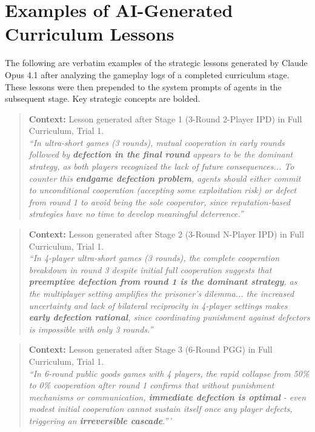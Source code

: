 \documentclass[11pt]{article}
\begin{document}
\section{Examples of AI-Generated Curriculum Lessons}
\label{app:claude_lessons}
The following are verbatim examples of the strategic lessons generated by Claude Opus 4.1 after analyzing the gameplay logs of a completed curriculum stage. These lessons were then prepended to the system prompts of agents in the subsequent stage. Key strategic concepts are bolded.

\begin{quote}
    \textbf{Context:} Lesson generated after Stage 1 (3-Round 2-Player IPD) in Full Curriculum, Trial 1. \\
    \textit{``In ultra-short games (3 rounds), mutual cooperation in early rounds followed by \textbf{defection in the final round} appears to be the dominant strategy, as both players recognized the lack of future consequences... To counter this \textbf{endgame defection problem}, agents should either commit to unconditional cooperation (accepting some exploitation risk) or defect from round 1 to avoid being the sole cooperator, since reputation-based strategies have no time to develop meaningful deterrence.''}
\end{quote}

\begin{quote}
    \textbf{Context:} Lesson generated after Stage 2 (3-Round N-Player IPD) in Full Curriculum, Trial 1. \\
    \textit{``In 4-player ultra-short games (3 rounds), the complete cooperation breakdown in round 3 despite initial full cooperation suggests that \textbf{preemptive defection from round 1 is the dominant strategy}, as the multiplayer setting amplifies the prisoner's dilemma... the increased uncertainty and lack of bilateral reciprocity in 4-player settings makes \textbf{early defection rational}, since coordinating punishment against defectors is impossible with only 3 rounds.''}
\end{quote}

\begin{quote}
    \textbf{Context:} Lesson generated after Stage 3 (6-Round PGG) in Full Curriculum, Trial 1. \\
    \textit{``In 6-round public goods games with 4 players, the rapid collapse from 50\% to 0\% cooperation after round 1 confirms that without punishment mechanisms or communication, \textbf{immediate defection is optimal} - even modest initial cooperation cannot sustain itself once any player defects, triggering an \textbf{irreversible cascade}.'''}
\end{quote}
\end{document}
